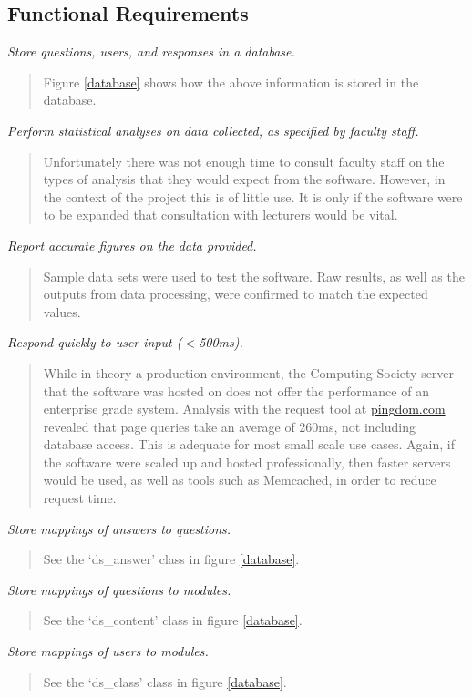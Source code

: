 \documentclass[12pt,a4paper,twoside]{report}
\begin{document}
\subsection{Functional Requirements}
\textit{Store questions, users, and responses in a database.}
\begin{quote}
Figure \ref{database} shows how the above information is stored in the database.
\end{quote}
\textit{Perform statistical analyses on data collected, as specified by faculty staff.}
\begin{quote}
Unfortunately there was not enough time to consult faculty staff on the types of analysis that they would expect from the software. However, in the context of the project this is of little use. It is only if the software were to be expanded that consultation with lecturers would be vital.
\end{quote}
\textit{Report accurate figures on the data provided.}
\begin{quote}
Sample data sets were used to test the software. Raw results, as well as the outputs from data processing, were confirmed to match the expected values.
\end{quote}
\textit{Respond quickly to user input ($<$500ms).}
\begin{quote}
While in theory a production environment, the Computing Society server that the software was hosted on does not offer the performance of an enterprise grade system. Analysis with the request tool at \url{pingdom.com} revealed that page queries take an average of 260ms, not including database access. This is adequate for most small scale use cases. Again, if the software were scaled up and hosted professionally, then faster servers would be used, as well as tools such as Memcached, in order to reduce request time. 
\end{quote}
\textit{Store mappings of answers to questions.}
\begin{quote}
See the `ds\_answer' class in figure \ref{database}.
\end{quote}
\textit{Store mappings of questions to modules.}
\begin{quote}
See the `ds\_content' class in figure \ref{database}.
\end{quote}
\textit{Store mappings of users to modules.}
\begin{quote}
See the `ds\_class' class in figure \ref{database}.
\end{quote}
\end{document}
